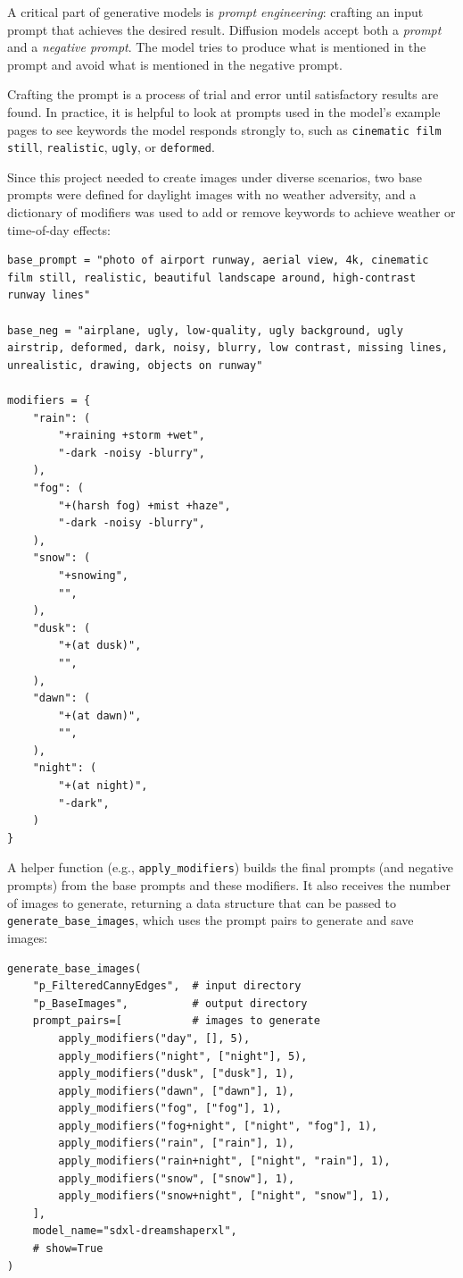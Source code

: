 A critical part of generative models is \emph{prompt engineering}: crafting an input prompt that achieves the desired result. 
Diffusion models accept both a \emph{prompt} and a \emph{negative prompt}. 
The model tries to produce what is mentioned in the prompt and avoid what is mentioned in the negative prompt.

Crafting the prompt is a process of trial and error until satisfactory results are found. 
In practice, it is helpful to look at prompts used in the model's example pages to see keywords the model responds strongly to, such as \texttt{cinematic film still}, \texttt{realistic}, \texttt{ugly}, or \texttt{deformed}.

Since this project needed to create images under diverse scenarios, two base prompts were defined for daylight images with no weather adversity, and a dictionary of modifiers was used to add or remove keywords to achieve weather or time-of-day effects:

\begin{lstlisting}
base_prompt = "photo of airport runway, aerial view, 4k, cinematic film still, realistic, beautiful landscape around, high-contrast runway lines"

base_neg = "airplane, ugly, low-quality, ugly background, ugly airstrip, deformed, dark, noisy, blurry, low contrast, missing lines, unrealistic, drawing, objects on runway"

modifiers = {
    "rain": (
        "+raining +storm +wet",
        "-dark -noisy -blurry",
    ),
    "fog": (
        "+(harsh fog) +mist +haze",
        "-dark -noisy -blurry",
    ),
    "snow": (
        "+snowing",
        "",
    ),
    "dusk": (
        "+(at dusk)",
        "",
    ),
    "dawn": (
        "+(at dawn)",
        "",
    ),
    "night": (
        "+(at night)",
        "-dark",
    )
}
\end{lstlisting}

A helper function (e.g., \texttt{apply\_modifiers}) builds the final prompts (and negative prompts) from the base prompts and these modifiers. 
It also receives the number of images to generate, returning a data structure that can be passed to \texttt{generate\_base\_images}, which uses the prompt pairs to generate and save images:

\begin{lstlisting}
generate_base_images(
    "p_FilteredCannyEdges",  # input directory
    "p_BaseImages",          # output directory
    prompt_pairs=[           # images to generate
        apply_modifiers("day", [], 5),
        apply_modifiers("night", ["night"], 5),
        apply_modifiers("dusk", ["dusk"], 1),
        apply_modifiers("dawn", ["dawn"], 1),
        apply_modifiers("fog", ["fog"], 1),
        apply_modifiers("fog+night", ["night", "fog"], 1),
        apply_modifiers("rain", ["rain"], 1),
        apply_modifiers("rain+night", ["night", "rain"], 1),
        apply_modifiers("snow", ["snow"], 1),
        apply_modifiers("snow+night", ["night", "snow"], 1),
    ],
    model_name="sdxl-dreamshaperxl",
    # show=True
)
\end{lstlisting}

